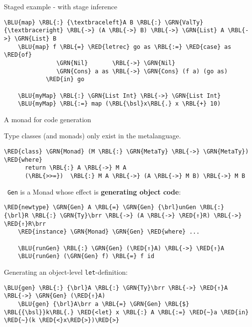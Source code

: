 \documentclass[dvipsnames,aspectratio=169]{beamer}
\newcommand{\ttt}[1]{{\texttt{#1}}}
\theoremstyle{remark}
\newcommand{\RED}[1]{{\color{BrickRed} #1}}
\newcommand{\GRN}[1]{{\color{OliveGreen} #1}}
\newcommand{\RBL}[1]{{\color{RoyalBlue} #1}}
\newcommand{\BLU}[1]{{\color{Blue} #1}}
\newcommand{\bsl}{\textbackslash}
\newcommand{\brl}{\textbraceleft}
\newcommand{\brr}{\textbraceright}
\begin{document}
\begin{frame}[fragile]{Staged example - with stage inference}

\begin{Verbatim}[commandchars=\\\{\}]
    \BLU{map} \RBL{:} {\textbraceleft}A B \RBL{:} \GRN{ValTy}{\textbraceright} \RBL{->} (A \RBL{->} B) \RBL{->} \GRN{List} A \RBL{->} \GRN{List} B
    \BLU{map} f \RBL{=} \RED{letrec} go as \RBL{:=} \RED{case} as \RED{of}
               \GRN{Nil}       \RBL{->} \GRN{Nil}
               \GRN{Cons} a as \RBL{->} \GRN{Cons} (f a) (go as)
            \RED{in} go

    \BLU{myMap} \RBL{:} \GRN{List Int} \RBL{->} \GRN{List Int}
    \BLU{myMap} \RBL{:=} map (\RBL{\bsl}x\RBL{.} x \RBL{+} 10)
\end{Verbatim}
\end{frame}

\begin{frame}[fragile]{A monad for code generation}

Type classes (and monads) only exist in the metalanguage.
\begin{Verbatim}[commandchars=\\\{\}]
    \RED{class} \GRN{Monad} (M \RBL{:} \GRN{MetaTy} \RBL{->} \GRN{MetaTy}) \RED{where}
      return \RBL{:} A \RBL{->} M A
      (\RBL{>>=})  \RBL{:} M A \RBL{->} (A \RBL{->} M B) \RBL{->} M B
\end{Verbatim}
\pause
\vspace{0.5em}
\ttt{\GRN{Gen}} is a Monad whose effect is \textbf{generating object code}:
\vspace{0.5em}
\begin{Verbatim}[commandchars=\\\{\}]
    \RED{newtype} \GRN{Gen} A \RBL{=} \GRN{Gen} {\brl}unGen \RBL{:} {\brl}R \RBL{:} \GRN{Ty}\brr \RBL{->} (A \RBL{->} \RED{⇑}R) \RBL{->} \RED{⇑}R\brr
    \RED{instance} \GRN{Monad} \GRN{Gen} \RED{where} ...

    \BLU{runGen} \RBL{:} \GRN{Gen} (\RED{⇑}A) \RBL{->} \RED{⇑}A
    \BLU{runGen} (\GRN{Gen} f) \RBL{=} f id
\end{Verbatim}
\pause
\vspace{0.3em}
Generating an object-level \ttt{let}-definition:
\begin{Verbatim}[commandchars=\\\{\}]
    \BLU{gen} \RBL{:} {\brl}A \RBL{:} \GRN{Ty}\brr \RBL{->} \RED{⇑}A \RBL{->} \GRN{Gen} (\RED{⇑}A)
    \BLU{gen} {\brl}A\brr a \RBL{=} \GRN{Gen} \RBL{$} \RBL{{\bsl}}k\RBL{.} \RED{<let} x \RBL{:} A \RBL{:=} \RED{~}a \RED{in} \RED{~}(k \RED{<}x\RED{>})\RED{>}
\end{Verbatim}

\end{frame}
\end{document}
